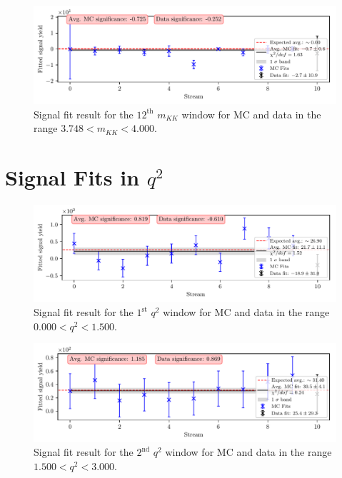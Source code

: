 \begin{figure}[H]
	\centering
	\captionsetup{width=0.8\linewidth}
	\includegraphics[width=\linewidth]{fig/sig_mKK_12}
	\caption{Signal fit result for the $12^{\mathrm{th}}$ $m_{KK}$ window for MC and data in the range $3.748<m_{KK}<4.000$.}
\end{figure}


\section{Signal Fits in \texorpdfstring{$q^2$}{q2}}
\label{sec:q2_plots}

\begin{figure}[H]
	\centering
	\captionsetup{width=0.8\linewidth}
	\includegraphics[width=\linewidth]{fig/sig_q2_1}
	\caption{Signal fit result for the $1^{\mathrm{st}}$ $q^2$ window for MC and data in the range $0.000  < q^2 < 1.500$.}
\end{figure}

\begin{figure}[H]
	\centering
	\captionsetup{width=0.8\linewidth}
	\includegraphics[width=\linewidth]{fig/sig_q2_2}
	\caption{Signal fit result for the $2^{\mathrm{nd}}$ $q^2$ window for MC and data in the range $1.500  < q^2 < 3.000$.}
\end{figure}

